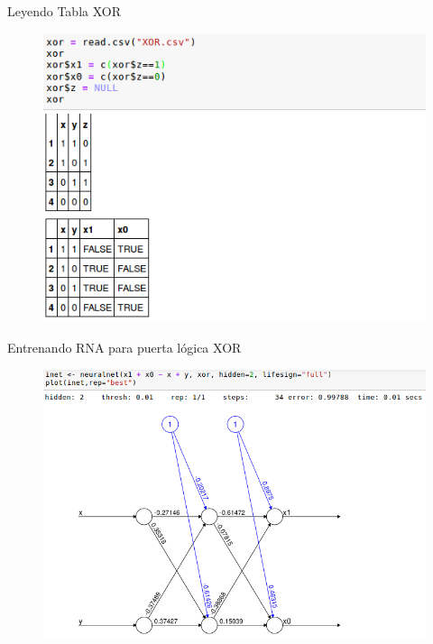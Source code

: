 \documentclass{beamer}
\begin{document}
\begin{frame}
\begin{block}{Leyendo Tabla XOR}
\begin{figure}
\includegraphics[scale=0.4]{readxor.png}
\centering
\end{figure}
\end{block}
\end{frame}

\begin{frame}
\begin{block}{Entrenando RNA para puerta lógica XOR}
\begin{figure}
\includegraphics[scale=0.4]{neuralnetxor.png}
\centering
\end{figure}
\end{block}
\end{frame}
\end{document}
